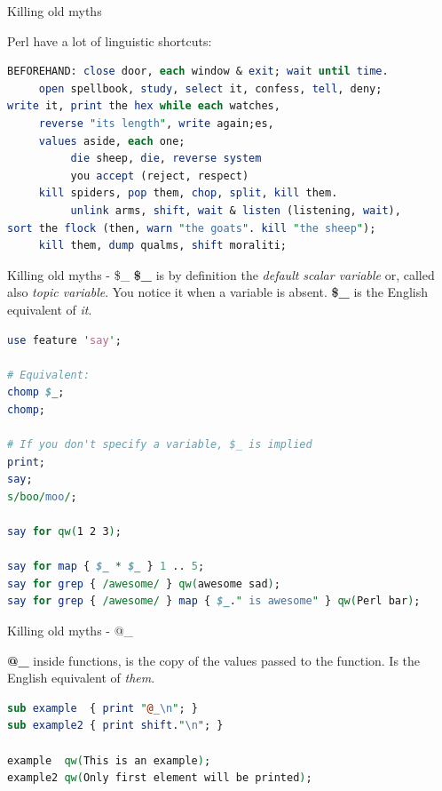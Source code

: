 \documentclass[10pt]{beamer}
\begin{document}
\begin{frame}[fragile]{Killing old myths}

Perl have a lot of linguistic shortcuts:
\begin{lstlisting}[language=perl,caption={extract of an adaptation for Perl5 by ovid of ``Black Perl'' poem written by Larry Wall},captionpos=b]
BEFOREHAND: close door, each window & exit; wait until time.
     open spellbook, study, select it, confess, tell, deny;
write it, print the hex while each watches,
     reverse "its length", write again;es,
     values aside, each one;
          die sheep, die, reverse system
          you accept (reject, respect)
     kill spiders, pop them, chop, split, kill them.
          unlink arms, shift, wait & listen (listening, wait),
sort the flock (then, warn "the goats". kill "the sheep");
     kill them, dump qualms, shift moraliti;
\end{lstlisting}
\end{frame}


\begin{frame}[fragile]{Killing old myths - \$\_}
\textbf{\$\_ }is by definition the \textit{default scalar variable} or, called also \textit{topic variable}.
You notice it when a variable is absent. \textbf{\$\_} is the English equivalent of \textit{it}.
\begin{lstlisting}[language=perl]
use feature 'say';

# Equivalent:
chomp $_;
chomp;

# If you don't specify a variable, $_ is implied
print;
say;
s/boo/moo/;

say for qw(1 2 3);

say for map { $_ * $_ } 1 .. 5;
say for grep { /awesome/ } qw(awesome sad);
say for grep { /awesome/ } map { $_." is awesome" } qw(Perl bar);
\end{lstlisting}
\end{frame}

\begin{frame}[fragile]{Killing old myths - @\_}

\textbf{@\_ } inside functions, is the copy of the values passed to the function. Is the English equivalent of \textit{them}.
\begin{lstlisting}[language=perl]
sub example  { print "@_\n"; }
sub example2 { print shift."\n"; }

example  qw(This is an example);
example2 qw(Only first element will be printed);
\end{lstlisting}

\end{frame}
\end{document}
